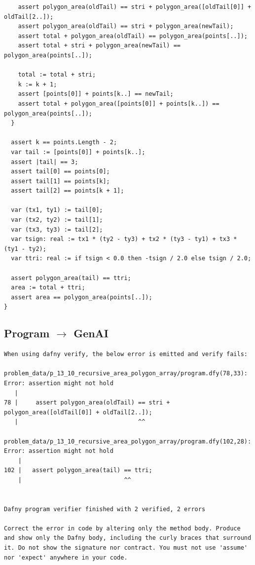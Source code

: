 \documentclass{article}
\begin{document}
\begin{lstlisting}
    assert polygon_area(oldTail) == stri + polygon_area([oldTail[0]] + oldTail[2..]);
    assert polygon_area(oldTail) == stri + polygon_area(newTail);
    assert total + polygon_area(oldTail) == polygon_area(points[..]);
    assert total + stri + polygon_area(newTail) == polygon_area(points[..]);

    total := total + stri;
    k := k + 1;
    assert [points[0]] + points[k..] == newTail;
    assert total + polygon_area([points[0]] + points[k..]) == polygon_area(points[..]);
  }

  assert k == points.Length - 2;
  var tail := [points[0]] + points[k..];
  assert |tail| == 3;
  assert tail[0] == points[0];
  assert tail[1] == points[k];
  assert tail[2] == points[k + 1];

  var (tx1, ty1) := tail[0];
  var (tx2, ty2) := tail[1];
  var (tx3, ty3) := tail[2];
  var tsign: real := tx1 * (ty2 - ty3) + tx2 * (ty3 - ty1) + tx3 * (ty1 - ty2);
  var ttri: real := if tsign < 0.0 then -tsign / 2.0 else tsign / 2.0;

  assert polygon_area(tail) == ttri;
  area := total + ttri;
  assert area == polygon_area(points[..]);
}
\end{lstlisting}
\subsection*{Program $\rightarrow$ GenAI}
\begin{lstlisting}
When using dafny verify, the below error is emitted and verify fails:

problem_data/p_13_10_recursive_area_polygon_array/program.dfy(78,33): Error: assertion might not hold
   |
78 |     assert polygon_area(oldTail) == stri + polygon_area([oldTail[0]] + oldTail[2..]);
   |                                  ^^

problem_data/p_13_10_recursive_area_polygon_array/program.dfy(102,28): Error: assertion might not hold
    |
102 |   assert polygon_area(tail) == ttri;
    |                             ^^


Dafny program verifier finished with 2 verified, 2 errors

Correct the error in code by altering only the method body. Produce and show only the Dafny body, including the curly braces that surround it. Do not show the signature nor contract. You must not use 'assume' nor 'expect' anywhere in your code.
\end{lstlisting}
\end{document}
